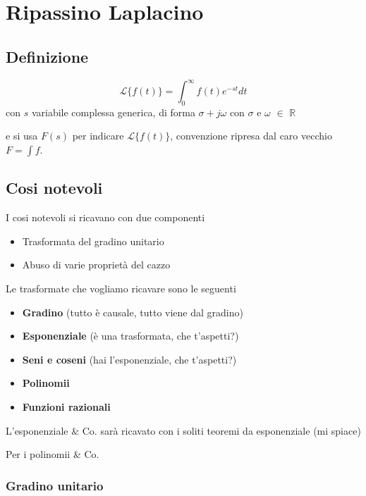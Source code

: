 \documentclass[11pt]{article}
\date{\today}
\title{}
\begin{document}
\tableofcontents

\section{Ripassino Laplacino}
\label{sec:org144fa91}

\subsection{Definizione}
\label{sec:orgab5d198}
\[\mathcal{L}\{f(t)\} = \int_{0}^{\infty} f(t) e^{-st} dt \]
con \(s\) variabile complessa generica, di forma \(\sigma + j\omega\) con
\(\sigma\) e \(\omega\) \(\in\) \(\mathbb{R}\)

e si usa \(F(s)\) per indicare \(\mathcal{L}\{f(t)\}\), convenzione
ripresa dal caro vecchio \(F = \int f\).

\subsection{Cosi notevoli}
\label{sec:org840e84f}

I cosi notevoli si ricavano con due componenti
\begin{itemize}
\item Trasformata del gradino unitario
\item Abuso di varie proprietà del cazzo
\end{itemize}

Le trasformate che vogliamo ricavare sono le seguenti
\begin{itemize}
\item \textbf{Gradino} (tutto è causale, tutto viene dal gradino)
\item \textbf{Esponenziale} (è una trasformata, che t'aspetti?)
\item \textbf{Seni e coseni} (hai l'esponenziale, che t'aspetti?)
\item \textbf{Polinomii}
\item \textbf{Funzioni razionali}
\end{itemize}

L'esponenziale \& Co. sarà ricavato con i soliti teoremi da
esponenziale (mi spiace)

Per i polinomii \& Co.

\subsubsection{Gradino unitario}
\label{sec:org7ec61f8}
\end{document}

